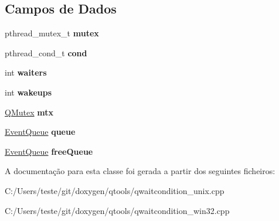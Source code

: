 \subsection*{Campos de Dados}
\begin{DoxyCompactItemize}
\item 
\hypertarget{class_q_wait_condition_private_a4acff8232e4aec9cd5c6dc200ac55ef3}{pthread\-\_\-mutex\-\_\-t {\bfseries mutex}}\label{class_q_wait_condition_private_a4acff8232e4aec9cd5c6dc200ac55ef3}

\item 
\hypertarget{class_q_wait_condition_private_a0a1433271fddfed84bc959ae6c202e5a}{pthread\-\_\-cond\-\_\-t {\bfseries cond}}\label{class_q_wait_condition_private_a0a1433271fddfed84bc959ae6c202e5a}

\item 
\hypertarget{class_q_wait_condition_private_a929be1ec58388fb3e66ea10a09ea8b66}{int {\bfseries waiters}}\label{class_q_wait_condition_private_a929be1ec58388fb3e66ea10a09ea8b66}

\item 
\hypertarget{class_q_wait_condition_private_a75e851a40bf402186dd70259af631a70}{int {\bfseries wakeups}}\label{class_q_wait_condition_private_a75e851a40bf402186dd70259af631a70}

\item 
\hypertarget{class_q_wait_condition_private_aa61f0b9ebc247f76675b05406cd8723b}{\hyperlink{class_q_mutex}{Q\-Mutex} {\bfseries mtx}}\label{class_q_wait_condition_private_aa61f0b9ebc247f76675b05406cd8723b}

\item 
\hypertarget{class_q_wait_condition_private_ac158b76bc8e2f8f232c4b8a73d1a2cb2}{\hyperlink{class_event_queue}{Event\-Queue} {\bfseries queue}}\label{class_q_wait_condition_private_ac158b76bc8e2f8f232c4b8a73d1a2cb2}

\item 
\hypertarget{class_q_wait_condition_private_abfb0519acd53ef713193795b2c7ad484}{\hyperlink{class_event_queue}{Event\-Queue} {\bfseries free\-Queue}}\label{class_q_wait_condition_private_abfb0519acd53ef713193795b2c7ad484}

\end{DoxyCompactItemize}


A documentação para esta classe foi gerada a partir dos seguintes ficheiros\-:\begin{DoxyCompactItemize}
\item 
C\-:/\-Users/teste/git/doxygen/qtools/qwaitcondition\-\_\-unix.\-cpp\item 
C\-:/\-Users/teste/git/doxygen/qtools/qwaitcondition\-\_\-win32.\-cpp\end{DoxyCompactItemize}
